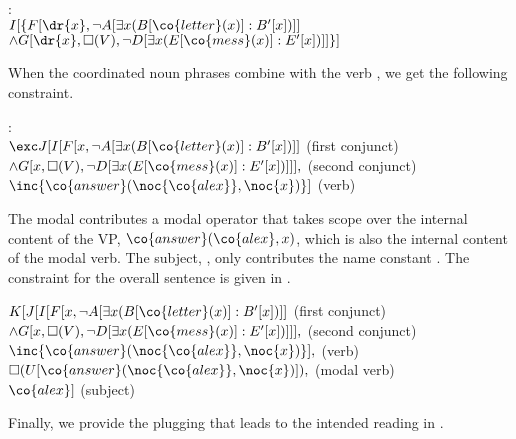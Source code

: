 \documentclass[output=paper]{langsci/langscibook}
\begin{document}
\ea \label{NandN-split-bi}
:\\
$I[\{F[\dr{x}, \lnot A[\exists x (B[\co{letter}(x)] : B'[x])]]$\\ 
\hspace*{1em}$\land 
G[\dr{x},\Box(V), \lnot D[\exists x (E[\co{mess}(x)]: E'[x])]]\}]$
\z 

When the coordinated noun phrases combine with the verb , we get the following constraint.

\ea \label{VP-split-bi}
: \\
$\exc J[I[F[x, \lnot A[\exists x (B[\co{letter}(x)] : B'[x])]]$
\hfill (first conjunct)\\
$\land 
G[x,\Box(V), \lnot D[\exists x (E[\co{mess}(x)]: E'[x])]]],$
\hfill (second conjunct)\\
$\inc{\co{answer}(\noc{\co{alex}},\noc{x})}
]$ \hfill (verb)
\z 

The modal  contributes a modal operator that takes scope over the internal content of the VP, $\co{answer}(\co{alex},x)$, which is also the internal content of the modal verb.
The subject, , only contributes the name constant . 
The constraint for the overall sentence is given in .

\ea \label{braucht-VP-split-bi}
$K[J[I[F[x, \lnot A[\exists x (B[\co{letter}(x)] : B'[x])]]$
\hfill (first conjunct)\\
\hspace*{1.5em}$\land 
G[x,\Box(V), \lnot D[\exists x (E[\co{mess}(x)]: E'[x])]]],$
\hfill (second conjunct)\\
$\inc{\co{answer}(\noc{\co{alex}},\noc{x})}
],$ \hfill (verb)\\
$\Box(U[\co{answer}(\noc{\co{alex}},\noc{x})]),$
\hfill (modal verb)\\
$\co{alex}]$ \hfill (subject)
\z 

Finally, we provide the plugging that leads to the intended reading in .
\end{document}
